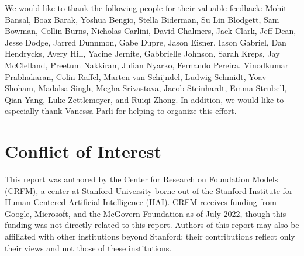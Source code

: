 \begin{acks}
We would like to thank the following people for their valuable feedback: Mohit Bansal, Boaz Barak, Yoshua Bengio, Stella Biderman, Su Lin Blodgett, Sam Bowman, Collin Burns, Nicholas Carlini, David Chalmers, Jack Clark, Jeff Dean, Jesse Dodge, Jarred Dunnmon, Gabe Dupre, Jason Eisner, Iason Gabriel, Dan Hendrycks, Avery Hill, Yacine Jernite, Gabbrielle Johnson, Sarah Kreps, Jay McClelland, Preetum Nakkiran, Julian Nyarko, Fernando Pereira, Vinodkumar Prabhakaran, Colin Raffel, Marten van Schijndel, Ludwig Schmidt, Yoav Shoham, Madalsa Singh, Megha Srivastava, Jacob Steinhardt, Emma Strubell, Qian Yang, Luke Zettlemoyer, and Ruiqi Zhong. In addition, we would like to especially thank Vanessa Parli for helping to organize this effort.
\end{acks}

\section*{Conflict of Interest} This report was authored by the Center for Research on Foundation Models (CRFM), a center at Stanford University borne out of the Stanford Institute for Human-Centered Artificial Intelligence (HAI). CRFM receives funding from Google, Microsoft, and the McGovern Foundation as of July 2022, though this funding was not directly related to this report. Authors of this report may also be affiliated with other institutions beyond Stanford: their contributions reflect only their views and not those of these institutions. 


